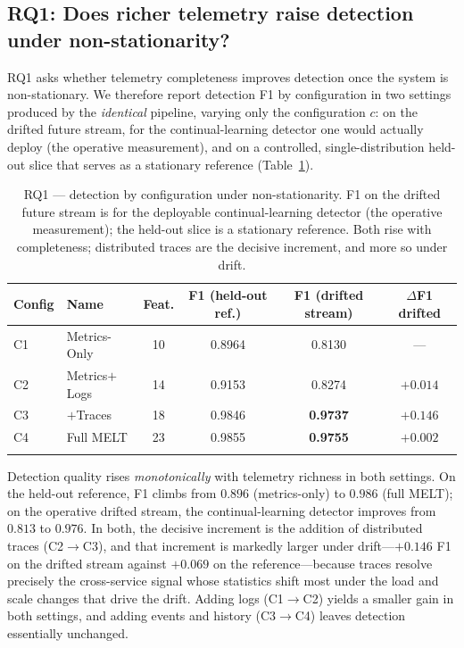 \documentclass[pdflatex,sn-mathphys-num]{sn-jnl}%
\theoremstyle{thmstyleone}%
\theoremstyle{thmstyletwo}%
\theoremstyle{thmstylethree}%
\begin{document}
\subsection{RQ1: Does richer telemetry raise detection under non-stationarity?}\label{sec:res-rq1}

RQ1 asks whether telemetry completeness improves detection once the system is non-stationary. We therefore report detection F1 by configuration in two settings produced by the \emph{identical} pipeline, varying only the configuration $c$: on the drifted future stream, for the continual-learning detector one would actually deploy (the operative measurement), and on a controlled, single-distribution held-out slice that serves as a stationary reference (Table~\ref{tab:rq1}).

\begin{table}[t]
\caption{RQ1 --- detection by configuration under non-stationarity. F1 on the drifted future stream is for the deployable continual-learning detector (the operative measurement); the held-out slice is a stationary reference. Both rise with completeness; distributed traces are the decisive increment, and more so under drift.}\label{tab:rq1}
\begin{tabular}{@{}llcccc@{}}
\toprule
Config & Name & Feat. & F1 (held-out ref.) & F1 (drifted stream) & $\Delta$F1 drifted \\
\midrule
C1 & Metrics-Only            & 10 & 0.8964 & 0.8130 & --- \\
C2 & Metrics${+}$Logs        & 14 & 0.9153 & 0.8274 & $+0.014$ \\
C3 & ${+}$Traces             & 18 & 0.9846 & \textbf{0.9737} & $+0.146$ \\
C4 & Full MELT               & 23 & 0.9855 & \textbf{0.9755} & $+0.002$ \\
\botrule
\end{tabular}
\end{table}

Detection quality rises \emph{monotonically} with telemetry richness in both settings. On the held-out reference, F1 climbs from $0.896$ (metrics-only) to $0.986$ (full MELT); on the operative drifted stream, the continual-learning detector improves from $0.813$ to $0.976$. In both, the decisive increment is the addition of distributed traces (C2$\rightarrow$C3), and that increment is markedly larger under drift---$+0.146$ F1 on the drifted stream against $+0.069$ on the reference---because traces resolve precisely the cross-service signal whose statistics shift most under the load and scale changes that drive the drift. Adding logs (C1$\rightarrow$C2) yields a smaller gain in both settings, and adding events and history (C3$\rightarrow$C4) leaves detection essentially unchanged.
\end{document}
